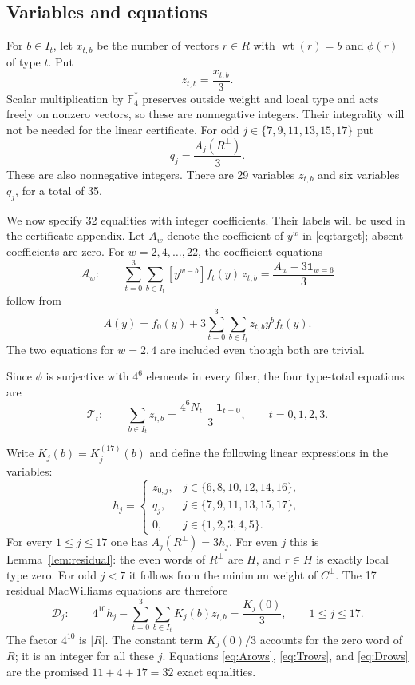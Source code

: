 \documentclass[11pt]{article}
\theoremstyle{remark}
\newcommand{\F}{\mathbb F_4}
\newcommand{\wt}{\operatorname{wt}}
\newcommand{\Arow}[1]{\mathcal A_{#1}}
\newcommand{\Trow}[1]{\mathcal T_{#1}}
\newcommand{\Drow}[1]{\mathcal D_{#1}}
\begin{document}
\subsection{Variables and equations}

For $b\in I_t$, let $x_{t,b}$ be the number of vectors $r\in R$ with
$\wt(r)=b$ and $\phi(r)$ of type $t$.  Put
\[
 z_{t,b}=\frac{x_{t,b}}3.
\]
Scalar multiplication by $\F^*$ preserves outside weight and local
type and acts freely on nonzero vectors, so these are nonnegative
integers.  Their integrality will not be needed for the linear certificate.
For odd $j\in\{7,9,11,13,15,17\}$ put
\[
 q_j=\frac{A_j(R^\perp)}3.
\]
These are also nonnegative integers.  There are 29 variables $z_{t,b}$
and six variables $q_j$, for a total of 35.

We now specify 32 equalities with integer coefficients.  Their labels
will be used in the certificate appendix.  Let $A_w$ denote the
coefficient of $y^w$ in \eqref{eq:target}; absent coefficients are zero.
For $w=2,4,\ldots,22$, the coefficient equations
\begin{equation}
 \Arow{w}:\qquad
 \sum_{t=0}^3\sum_{b\in I_t}
       [y^{w-b}]f_t(y)\,z_{t,b}
 =\frac{A_w-3\boldsymbol1_{w=6}}3
 \label{eq:Arows}
\end{equation}
follow from
\[
 A(y)=f_0(y)+3\sum_{t=0}^3\sum_{b\in I_t}z_{t,b}y^b f_t(y).
\]
The two equations for $w=2,4$ are included even though both are trivial.

Since $\phi$ is surjective with $4^6$ elements in every fiber, the four
type-total equations are
\begin{equation}
 \Trow{t}:\qquad
 \sum_{b\in I_t}z_{t,b}
   =\frac{4^6N_t-\boldsymbol1_{t=0}}3,
 \qquad t=0,1,2,3.
 \label{eq:Trows}
\end{equation}

Write $K_j(b)=K_j^{(17)}(b)$ and define the following linear expressions
in the variables:
\begin{equation}
 h_j=
 \begin{cases}
   z_{0,j},&j\in\{6,8,10,12,14,16\},\\
   q_j,&j\in\{7,9,11,13,15,17\},\\
   0,&j\in\{1,2,3,4,5\}.
 \end{cases}
 \label{eq:hdef}
\end{equation}
For every $1\leq j\leq17$ one has $A_j(R^\perp)=3h_j$.
For even $j$ this is Lemma~\ref{lem:residual}: the even words of
$R^\perp$ are $H$, and $r\in H$ is exactly local type zero.
For odd $j<7$ it follows from the minimum weight of $C^\perp$.
The 17 residual MacWilliams equations are therefore
\begin{equation}
 \Drow{j}:\qquad
 4^{10}h_j-
 \sum_{t=0}^3\sum_{b\in I_t} K_j(b)z_{t,b}
   =\frac{K_j(0)}3,
 \qquad 1\leq j\leq17.
 \label{eq:Drows}
\end{equation}
The factor $4^{10}$ is $|R|$.  The constant term $K_j(0)/3$ accounts
for the zero word of $R$; it is an integer for all these $j$.
Equations \eqref{eq:Arows}, \eqref{eq:Trows}, and \eqref{eq:Drows}
are the promised $11+4+17=32$ exact equalities.
\end{document}
